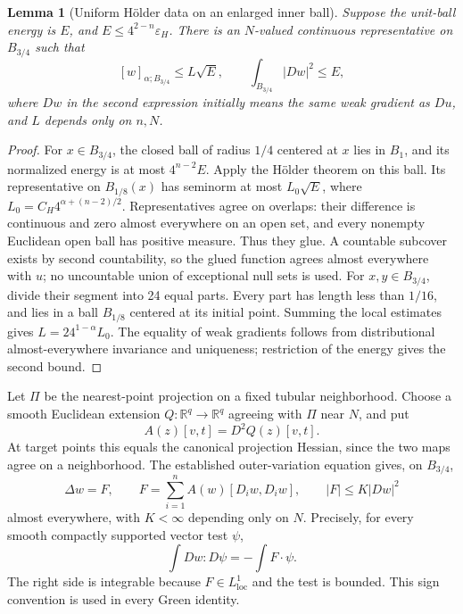 \documentclass[11pt,a4paper]{article}
\numberwithin{equation}{section}
\newtheorem{lemma}[theorem]{Lemma}
\theoremstyle{definition}
\theoremstyle{remark}
\newcommand{\R}{\mathbb R}
\begin{document}
\begin{lemma}[Uniform H\"older data on an enlarged inner ball]
\label{lem:localholder}
Suppose the unit-ball energy is \(E\), and
\(E\le4^{2-n}\varepsilon_H\). There is an \(N\)-valued continuous
representative on \(B_{3/4}\) such that
\begin{equation}\label{eq:holderinput}
 [w]_{\alpha;B_{3/4}}\le L\sqrt E,
 \qquad \int_{B_{3/4}}|Dw|^2\le E,
\end{equation}
where \(Dw\) in the second expression initially means the same weak
gradient as \(Du\), and \(L\) depends only on \(n,N\).
\end{lemma}
\begin{proof}
For \(x\in B_{3/4}\), the closed ball of radius \(1/4\) centered at \(x\)
lies in \(B_1\), and its normalized energy is at most \(4^{n-2}E\).
Apply the H\"older theorem on this ball. Its representative on \(B_{1/8}(x)\)
has seminorm at most
\(L_0\sqrt E\), where \(L_0=C_H4^{\alpha+(n-2)/2}\).
Representatives agree on overlaps: their difference is continuous and zero
almost everywhere on an open set, and every nonempty Euclidean open ball
has positive measure. Thus they glue. A countable subcover exists by second
countability, so the glued function agrees almost everywhere with \(u\);
no uncountable union of exceptional null sets is used.
For \(x,y\in B_{3/4}\), divide their segment into 24 equal parts. Every
part has length less than \(1/16\), and lies in a ball \(B_{1/8}\) centered
at its initial point. Summing the local estimates gives
\(L=24^{1-\alpha}L_0\). The equality of weak gradients follows from
distributional almost-everywhere invariance and uniqueness; restriction
of the energy gives the second bound.
\end{proof}

Let \(\Pi\) be the nearest-point projection on a fixed tubular neighborhood.
Choose a smooth Euclidean extension \(Q:\R^q\to\R^q\) agreeing with
\(\Pi\) near \(N\), and put
\begin{equation}\label{eq:coefficient}
 A(z)[v,t]=D^2Q(z)[v,t].
\end{equation}
At target points this equals the canonical projection Hessian, since
the two maps agree on a neighborhood. The established outer-variation
equation gives, on \(B_{3/4}\),
\begin{equation}\label{eq:weak}
 \Delta w=F,\qquad
 F=\sum_{i=1}^n A(w)[D_iw,D_iw],\qquad |F|\le K|Dw|^2
\end{equation}
almost everywhere, with \(K<\infty\) depending only on \(N\). Precisely,
for every smooth compactly supported vector test \(\psi\),
\[
 \int Dw:D\psi=-\int F\cdot\psi.
\]
The right side is integrable because \(F\in L^1_{\mathrm{loc}}\) and the
test is bounded. This sign convention is used in every Green identity.
\end{document}
